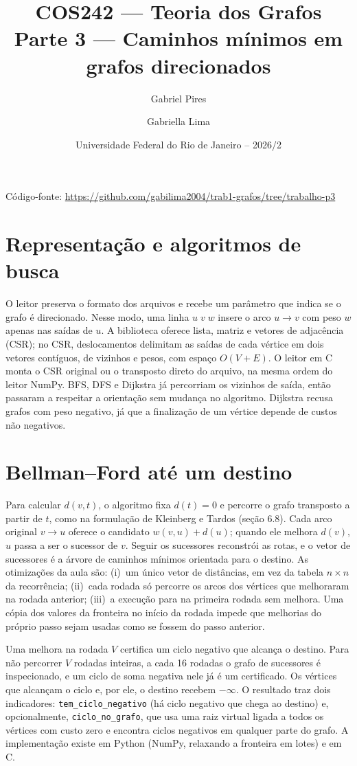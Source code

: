 \documentclass[a4paper,11pt]{article}
\title{\vspace{-1.5em}\textcolor{azul}{COS242 --- Teoria dos Grafos}\\Parte 3 --- Caminhos mínimos em grafos direcionados}
\author{Gabriel Pires \and Gabriella Lima}
\date{Universidade Federal do Rio de Janeiro -- 2026/2}
\begin{document}
\maketitle
\vspace{-1.5em}
\begin{center}
Código-fonte: \url{https://github.com/gabilima2004/trab1-grafos/tree/trabalho-p3}
\end{center}

\section{Representação e algoritmos de busca}

O leitor preserva o formato dos arquivos e recebe um parâmetro que indica se o grafo é direcionado. Nesse modo, uma linha \(u\;v\;w\) insere o arco \(u\to v\) com peso \(w\) apenas nas saídas de \(u\). A biblioteca oferece lista, matriz e vetores de adjacência (CSR); no CSR, deslocamentos delimitam as saídas de cada vértice em dois vetores contíguos, de vizinhos e pesos, com espaço \(O(V+E)\). O leitor em C monta o CSR original ou o transposto direto do arquivo, na mesma ordem do leitor NumPy. BFS, DFS e Dijkstra já percorriam os vizinhos de saída, então passaram a respeitar a orientação sem mudança no algoritmo. Dijkstra recusa grafos com peso negativo, já que a finalização de um vértice depende de custos não negativos.

\section{Bellman--Ford até um destino}

Para calcular \(d(v,t)\), o algoritmo fixa \(d(t)=0\) e percorre o grafo transposto a partir de \(t\), como na formulação de Kleinberg e Tardos (seção 6.8). Cada arco original \(v\to u\) oferece o candidato \(w(v,u)+d(u)\); quando ele melhora \(d(v)\), \(u\) passa a ser o sucessor de \(v\). Seguir os sucessores reconstrói as rotas, e o vetor de sucessores é a árvore de caminhos mínimos orientada para o destino. As otimizações da aula são: (i)~um único vetor de distâncias, em vez da tabela \(n\times n\) da recorrência; (ii)~cada rodada só percorre os arcos dos vértices que melhoraram na rodada anterior; (iii)~a execução para na primeira rodada sem melhora. Uma cópia dos valores da fronteira no início da rodada impede que melhorias do próprio passo sejam usadas como se fossem do passo anterior.

Uma melhora na rodada \(V\) certifica um ciclo negativo que alcança o destino. Para não percorrer \(V\) rodadas inteiras, a cada 16 rodadas o grafo de sucessores é inspecionado, e um ciclo de soma negativa nele já é um certificado. Os vértices que alcançam o ciclo e, por ele, o destino recebem \(-\infty\). O resultado traz dois indicadores: \texttt{tem\_ciclo\_negativo} (há ciclo negativo que chega ao destino) e, opcionalmente, \texttt{ciclo\_no\_grafo}, que usa uma raiz virtual ligada a todos os vértices com custo zero e encontra ciclos negativos em qualquer parte do grafo. A implementação existe em Python (NumPy, relaxando a fronteira em lotes) e em C.
\end{document}

